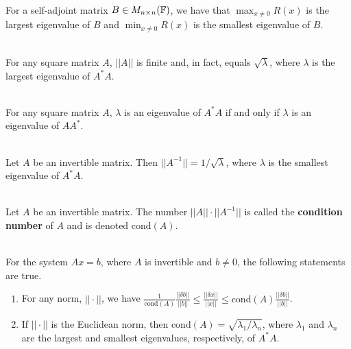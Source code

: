 \begin{theorem}
	\hfill\\
	For a self-adjoint matrix $B \in M_{n \times n}(\mathbb{F})$, we have that $\displaystyle\max_{x \neq 0}R(x)$ is the largest eigenvalue of $B$ and $\displaystyle\min_{x \neq 0}R(x)$ is the smallest eigenvalue of $B$.
\end{theorem}

\begin{corollary}
	\hfill\\
	For any square matrix $A$, $||A||$ is finite and, in fact, equals $\sqrt{\lambda}$, where $\lambda$ is the largest eigenvalue of $A^*A$.
\end{corollary}

\begin{lemma}
	\hfill\\
	For any square matrix $A$, $\lambda$ is an eigenvalue of $A^*A$ if and only if $\lambda$ is an eigenvalue of $AA^*$.
\end{lemma}

\begin{corollary}
	\hfill\\
	Let $A$ be an invertible matrix. Then $||A^{-1}|| = 1/\sqrt{\lambda}$, where $\lambda$ is the smallest eigenvalue of $A^*A$.
\end{corollary}

\begin{definition}
	\hfill\\
	Let $A$ be an invertible matrix. The number $||A||\cdot||A^{-1}||$ is called the \textbf{condition number} of $A$ and is denoted $\text{cond}(A)$.
\end{definition}

\begin{theorem}
	\hfill\\
	For the system $Ax = b$, where $A$ is invertible and $b \neq 0$, the following statements are true.

	\begin{enumerate}
		\item For any norm, $||\cdot||$, we have $\displaystyle\frac{1}{\text{cond}(A)}\frac{||\delta b ||}{||b||} \leq \frac{||\delta x||}{||x||} \leq \text{cond}(A)\frac{||\delta b||}{||b||}$.
		\item If $||\cdot||$ is the Euclidean norm, then $\text{cond}(A) = \sqrt{\lambda_1/\lambda_n}$, where $\lambda_1$ and $\lambda_n$ are the largest and smallest eigenvalues, respectively, of $A^*A$.
	\end{enumerate}
\end{theorem}
